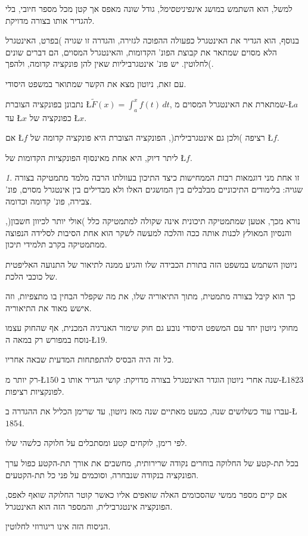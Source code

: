 \documentclass[english,hebrew]{article}
\theoremstyle{remark}
\newtheorem*{rem*}{\protect\remarkname}
\theoremstyle{definition}
\theoremstyle{plain}
\theoremstyle{remark}
\theoremstyle{plain}
\theoremstyle{plain}
\providecommand{\remarkname}{הערה}
\begin{document}
למשל, הוא השתמש במושג \emph{אינפיניטסימל}, גודל שונה מאפס אך קטן מכל
מספר חיובי, בלי להגדיר אותו בצורה מדויקת.

בנוסף, הוא הגדיר את האינטגרל כפעולה ההפוכה לגזירה, והגדרה זו שגויה
)בפרט, האינטגרל הלא מסוים שמתאר את קבוצת הפונ' הקדומות, והאינטגרל
המסוים, הם דברים שונים לחלוטין. יש פונ' אינטגרביליות שאין להן פונקציה
קדומה, ולהפך(.

עם זאת, ניוטון מצא את הקשר שמתואר במשפט היסודי.

נתבונן בפונקציה הצוברת \L{$\tilde{F}(x)=\int_{a}^{x}f(t)\,dt$}, שמתארת
את האינטגרל המסוים מ-\L{$a$} עד \L{$x$} כפונקציה של \L{$x$}. 

אם \L{$f$} רציפה )ולכן גם אינטגרבילית(, הפונקציה הצוברת היא פונקציה
קדומה של \L{$f$}.

ליתר דיוק, היא אחת מאינסוף הפונקציות הקדומות של \L{$f$}.
\begin{rem*}
זו אחת מני דוגמאות רבות הממחישות כיצד התיכון בעוולתו הרבה מלמד מתמטיקה
בצורה שגויה: בלימודים התיכוניים מבלבלים בין המושגים האלו ולא מבדילים
בין אינטגרל מסוים, פונ' צבירה, פונ' קדומה וכדומה.

נורא מכך, אטען שמתמטיקה תיכונית אינה שקולה למתמטיקה כלל )אולי יותר
לכיוון חשבון(, והנסיון המאולץ לכנות אותה ככה והלכה למעשה לשקר הוא
אחת הסיבות לסלידה הנפוצה ממתמטיקה בקרב תלמידי תיכון.
\end{rem*}
ניוטון השתמש במשפט הזה בתורת הכבידה שלו והגיע ממנה לתיאור של התנועה
האליפטית של כוכבי הלכת.

כך הוא קיבל בצורה מתמטית, מתוך התיאוריה שלו, את מה שקפלר הבחין בו
מתצפיות, וזה אישש מאוד את התיאוריה.

מחוקי ניוטון יחד עם המשפט היסודי נובע גם חוק שימור האנרגיה המכנית,
אף שהחוק עצמו נוסח במפורש רק במאה ה-\L{$19$}.

כל זה היה הבסיס להתפתחות המדעית שבאה אחריו.

רק יותר מ-\L{$150$} שנה אחרי ניוטון הוגדר האינטגרל בצורה מדויקת:
קושי הגדיר אותו ב-\L{$1823$} לפונקציות רציפות.

עברו עוד כשלושים שנה, כמעט מאתיים שנה מאז ניוטון, עד שרימן הכליל את
ההגדרה ב-\L{$1854$}.

לפי רימן, לוקחים קטע ומסתכלים על חלוקה כלשהי שלו.

בכל תת-קטע של החלוקה בוחרים נקודה שרירותית, מחשבים את אורך תת-הקטע
כפול ערך הפונקציה בנקודה שנבחרה, וסוכמים על פני כל תת-הקטעים. 

אם קיים מספר ממשי שהסכומים האלה שואפים אליו כאשר קוטר החלוקה שואף
לאפס, הפונקציה אינטגרבילית, והמספר הזה הוא האינטגרל.

הניסוח הזה אינו ריגורוזי לחלוטין.
\end{document}
